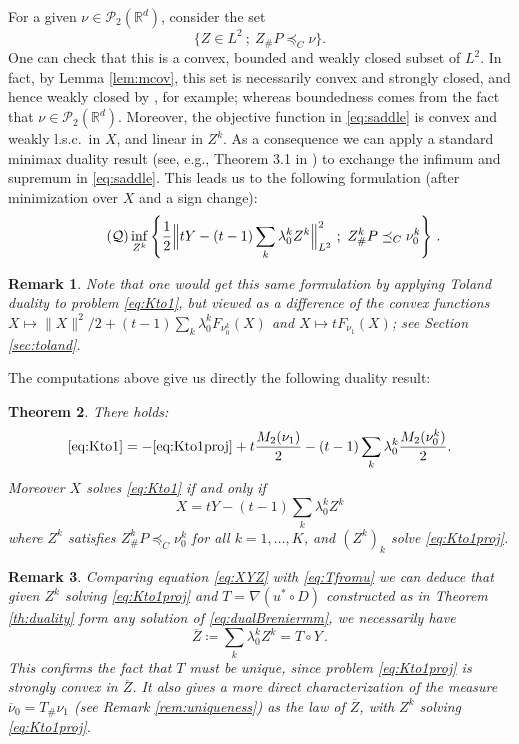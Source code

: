 \documentclass[12pt]{amsart}
\numberwithin{equation}{section}
\let\mc=\mathcal
\theoremstyle{plain}
\newtheorem{theorem}{Theorem}[section]
\newtheorem{remark}[theorem]{Remark}
\theoremstyle{definition}
\newcommand\gab{\textcolor{blue}}
\begin{document}
For a given $\nu\in\mc{P}_2(\mathbb{R}^d)$, consider the set 
\[
\{ Z \in L^2 ~;~ Z_\# P \preceq_C \nu\} .
\]
One can check that this is a convex, bounded and weakly closed subset of $L^2$. In fact, by Lemma \ref{lem:mcov}, this set is necessarily convex and strongly closed, and hence weakly closed by \cite[Theorem 3.7]{brezis2011functional}, for example; whereas boundedness comes from the fact that $\nu \in \mc{P}_2(\mathbb{R}^d)$. Moreover, the objective function in \eqref{eq:saddle} %
is convex and weakly l.s.c.\ in $X$, and linear in $Z^k$. As a consequence we can apply a standard minimax duality result (see, e.g., Theorem 3.1 in \cite{simons2006minimax}) to exchange the infimum and supremum in \eqref{eq:saddle}. This leads us to the following formulation (after minimization over $X$ and a sign change):
\begin{equation} \tag{$\mc{Q}$} \label{eq:Kto1proj}
    \inf_{Z^k} \left\{ \frac{1}{2} \Big\|tY - (t-1) \sum_k \lambda^k_0 Z^k\Big\|^2_{L^2} ~ ; ~ Z^k_\# P \preceq_C \nu_0^k  \right\}\,.
\end{equation}

\begin{remark}
Note that one would get this same formulation by applying Toland duality to problem \eqref{eq:Kto1}, but viewed as a difference of the convex functions $X \mapsto \|X\|^2/2 + (t-1) \sum_k \lambda_0^k F_{\nu_0^k}(X)$ and $X \mapsto t F_{\nu_1}(X)$; see Section \ref{sec:toland}. 
 \end{remark}


The computations above give us directly the following duality result:

\begin{theorem} \label{th:kto1proj} There holds:
\[
\eqref{eq:Kto1} = - \eqref{eq:Kto1proj} + t \frac{M_2(\nu_1)}{2} -(t-1) \sum_k \lambda_0^k \frac{M_2(\nu_0^k)}{2}.
\]
Moreover $X$ solves \eqref{eq:Kto1} if and only if 
\begin{equation}\label{eq:XYZ}
X = tY - (t-1) \sum_k \lambda^k_0 Z^k
\end{equation}
where $Z^k$ satisfies $Z^k_\# P \preceq_C \nu_0^k$ for all $k=1,\ldots,K$, and $(Z^k)_k$ solve \eqref{eq:Kto1proj}.
\end{theorem}

\begin{remark} Comparing equation \eqref{eq:XYZ} with \eqref{eq:Tfromu} we can deduce that given $Z^k$ solving \eqref{eq:Kto1proj} and $T=\nabla (u^* \circ D)$ constructed as in Theorem \ref{th:duality} form any solution of \eqref{eq:dualBreniermm}, we necessarily have
\begin{equation}\label{eq:zbar}
\overline{Z}\coloneqq \sum_k \lambda^k_0 Z^k = T \circ Y\,.
\end{equation}
This confirms the fact that $T$ must be unique, since problem \eqref{eq:Kto1proj} is strongly convex in $\overline{Z}$. It also gives a more direct characterization of the measure $\overline{\nu}_0 = T_\# \nu_1$ (see Remark \ref{rem:uniqueness}) as the law of $\overline{Z}$, with $Z^k$ solving \eqref{eq:Kto1proj}.
\end{remark}
\end{document}
